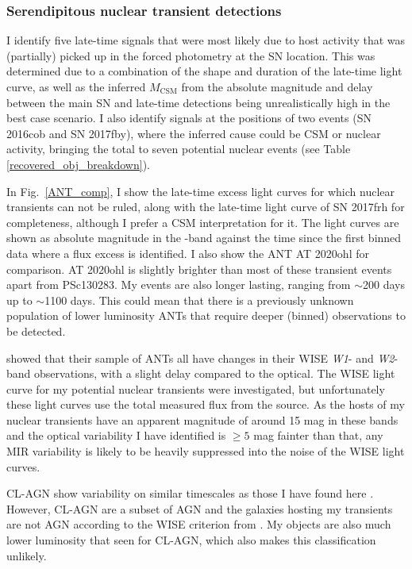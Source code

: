 \documentclass[a4paper,oneside,12pt, class=Latex/Classes/PhDthesisPSnPDF, crop=false]{standalone}
\begin{document}
\subsubsection{Serendipitous nuclear transient detections}
\label{sec:discussion:nuclear}
I identify five late-time signals that were most likely due to host activity that was (partially) picked up in the forced photometry at the SN location. This was determined due to a combination of the shape and duration of the late-time light curve, as well as the inferred $M_\text{CSM}$ from the absolute magnitude and delay between the main SN and late-time detections being unrealistically high in the best case scenario. I also identify signals at the positions of two events (SN 2016cob and SN 2017fby), where the inferred cause could be CSM or nuclear activity, bringing the total to seven potential nuclear events (see Table \ref{recovered_obj_breakdown}).

In Fig.~\ref{ANT_comp}, I show the late-time excess light curves for which nuclear transients can not be ruled, along with the late-time light curve of SN 2017frh for completeness, although I prefer a CSM interpretation for it. The light curves are shown as absolute magnitude in the \ztfr-band against the time since the first binned data where a flux excess is identified. I also show the ANT AT 2020ohl \citep{2020ohl_Hinkle} for comparison. AT 2020ohl is slightly brighter than most of these transient events apart from PSc130283. My events are also longer lasting, ranging from $\sim$200 days up to $\sim$1100 days. This could mean that there is a previously unknown population of lower luminosity ANTs that require deeper (binned) observations to be detected.

\citet{wiseman_ztfants} showed that their sample of ANTs all have changes in their WISE \textit{W1}- and \textit{W2}-band observations, with a slight delay compared to the optical. The WISE light curve for my potential nuclear transients were investigated, but unfortunately these light curves use the total measured flux from the source. As the hosts of my nuclear transients have an apparent magnitude of around 15 mag in these bands and the optical variability I have identified is $\geq5$ mag fainter than that, any MIR variability is likely to be heavily suppressed into the noise of the WISE light curves.

CL-AGN show variability on similar timescales as those I have found here \citep{CLAGN}. However, CL-AGN are a subset of AGN and the galaxies hosting my transients are not AGN according to the WISE criterion from \citet{WISE_crit}. My objects are also much lower luminosity that seen for CL-AGN, which also makes this classification unlikely.
\end{document}
